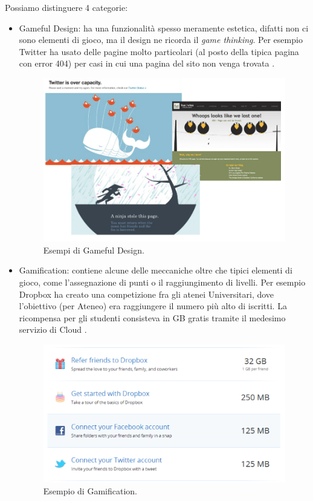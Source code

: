 Possiamo distinguere 4 categorie:

\begin{itemize}
\item Gameful Design: ha una funzionalità spesso meramente estetica, difatti non ci sono elementi di gioco, ma il design ne ricorda il \textit{game thinking}. Per esempio Twitter ha usato delle pagine molto particolari (al posto della tipica pagina con error 404) per casi in cui una pagina del sito non venga trovata \myfig{\ref{fig:gamefuldesignex}}.

\begin{figure}[h]
\centerline{\includegraphics[scale=0.35]{images/statoarte/gamefuldesignex.png}}
\caption{Esempi di Gameful Design.}
\label{fig:gamefuldesignex}
\end{figure}

\item Gamification: contiene alcune delle meccaniche oltre che tipici elementi di gioco, come l'assegnazione di punti o il raggiungimento di livelli. Per esempio Dropbox ha creato una competizione fra gli atenei Universitari, dove l'obiettivo (per Ateneo) era raggiungere il numero più alto di iscritti. La ricompensa per gli studenti consisteva in GB gratis tramite il medesimo servizio di Cloud \myfig{\ref{fig:gamefuldesignex}}.

\begin{figure}[b]
\centerline{\includegraphics[scale=0.3]{images/statoarte/gamificationex.png}}
\caption{Esempio di Gamification.}
\label{fig:gamificationex}
\end{figure}


\end{itemize}
